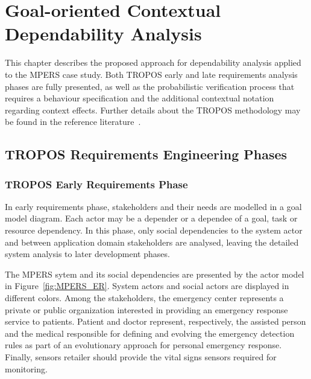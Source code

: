 \chapter{Goal-oriented Contextual Dependability Analysis}\label{ch:proposal}

This chapter describes the proposed approach for dependability analysis applied to the MPERS case study. Both TROPOS early and late requirements analysis phases are fully presented, as well as the probabilistic verification process that requires a behaviour specification and the additional contextual notation regarding context effects. Further details about the TROPOS methodology may be found in the reference literature~\cite{Bresciani:2004}. 

\section{TROPOS Requirements Engineering Phases}

\subsection{TROPOS Early Requirements Phase}

In early requirements phase, stakeholders and their needs are modelled in a goal model diagram. Each actor may be a depender or a dependee of a goal, task or resource dependency. In this phase, only social dependencies to the system actor and between application domain stakeholders are analysed, leaving the detailed system analysis to later development phases.

The MPERS sytem and its social dependencies are presented by the actor model in Figure~\ref{fig:MPERS_ER}. System actors and social actors are displayed in different colors. Among the stakeholders, the emergency center represents a private or public organization interested in providing an emergency response service to patients. Patient and doctor represent, respectively, the assisted person and the medical responsible for defining and evolving the emergency detection rules as part of an evolutionary approach for personal emergency response. Finally, sensors retailer should provide the vital signs sensors required for monitoring.


